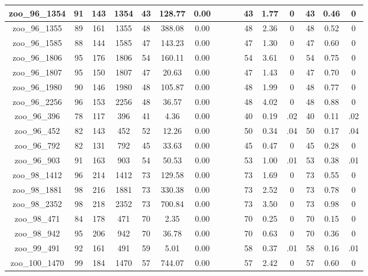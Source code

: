 \begin{landscape}
\begin{longtable}{|c|c|c|c|c|c|c|c|c|c|c|c|c|c|c|c|}
zoo\_96\_1354 & 91 & 143 & 1354 & 43 & 128.77 & 0.00 &  &  &  & 43 & 1.77 & 0 & 43 & 0.46 & 0 \\ \hline 
zoo\_96\_1355 & 89 & 161 & 1355 & 48 & 388.08 & 0.00 &  &  &  & 48 & 2.36 & 0 & 48 & 0.52 & 0 \\ \hline 
zoo\_96\_1585 & 88 & 144 & 1585 & 47 & 143.23 & 0.00 &  &  &  & 47 & 1.30 & 0 & 47 & 0.60 & 0 \\ \hline 
zoo\_96\_1806 & 95 & 176 & 1806 & 54 & 160.11 & 0.00 &  &  &  & 54 & 3.61 & 0 & 54 & 0.75 & 0 \\ \hline 
zoo\_96\_1807 & 95 & 150 & 1807 & 47 & 20.63 & 0.00 &  &  &  & 47 & 1.43 & 0 & 47 & 0.70 & 0 \\ \hline 
zoo\_96\_1980 & 90 & 146 & 1980 & 48 & 105.87 & 0.00 &  &  &  & 48 & 1.99 & 0 & 48 & 0.77 & 0 \\ \hline 
zoo\_96\_2256 & 96 & 153 & 2256 & 48 & 36.57 & 0.00 &  &  &  & 48 & 4.02 & 0 & 48 & 0.88 & 0 \\ \hline 
zoo\_96\_396 & 78 & 117 & 396 & 41 & 4.36 & 0.00 &  &  &  & 40 & 0.19 & .02 & 40 & 0.11 & .02 \\ \hline 
zoo\_96\_452 & 82 & 143 & 452 & 52 & 12.26 & 0.00 &  &  &  & 50 & 0.34 & .04 & 50 & 0.17 & .04 \\ \hline 
zoo\_96\_792 & 82 & 131 & 792 & 45 & 33.63 & 0.00 &  &  &  & 45 & 0.47 & 0 & 45 & 0.28 & 0 \\ \hline 
zoo\_96\_903 & 91 & 163 & 903 & 54 & 50.53 & 0.00 &  &  &  & 53 & 1.00 & .01 & 53 & 0.38 & .01 \\ \hline 
zoo\_98\_1412 & 96 & 214 & 1412 & 73 & 129.58 & 0.00 &  &  &  & 73 & 1.69 & 0 & 73 & 0.55 & 0 \\ \hline 
zoo\_98\_1881 & 98 & 216 & 1881 & 73 & 330.38 & 0.00 &  &  &  & 73 & 2.52 & 0 & 73 & 0.78 & 0 \\ \hline 
zoo\_98\_2352 & 98 & 218 & 2352 & 73 & 700.84 & 0.00 &  &  &  & 73 & 3.50 & 0 & 73 & 0.98 & 0 \\ \hline 
zoo\_98\_471 & 84 & 178 & 471 & 70 & 2.35 & 0.00 &  &  &  & 70 & 0.25 & 0 & 70 & 0.15 & 0 \\ \hline 
zoo\_98\_942 & 95 & 206 & 942 & 70 & 36.78 & 0.00 &  &  &  & 70 & 0.63 & 0 & 70 & 0.36 & 0 \\ \hline 
zoo\_99\_491 & 92 & 161 & 491 & 59 & 5.01 & 0.00 &  &  &  & 58 & 0.37 & .01 & 58 & 0.16 & .01 \\ \hline 
zoo\_100\_1470 & 99 & 184 & 1470 & 57 & 744.07 & 0.00 &  &  &  & 57 & 2.42 & 0 & 57 & 0.60 & 0 \\ \hline 

\end{longtable}
\end{landscape}
